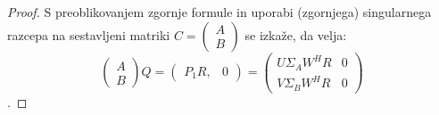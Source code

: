 \documentclass[mat1]{article}
\begin{document}
\begin{proof}
S preoblikovanjem zgornje formule in uporabi (zgornjega) singularnega razcepa na sestavljeni matriki $C = 
\begin{pmatrix}
A \\
B
\end{pmatrix}$ se izkaže, da velja:
$$ 
\begin{pmatrix}
A \\
B
\end{pmatrix}
Q =
\left(\begin{array}{lr} P_1R, & 0 \end{array}\right)
=
\begin{pmatrix}
U \Sigma_A W^HR & 0 \\
V \Sigma_B W^HR & 0
\end{pmatrix}
$$.
\end{proof}
\end{document}
